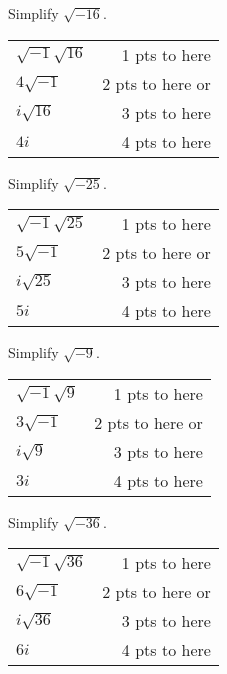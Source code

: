 {
	Simplify $\sqrt{-16}$.
}
{
	\begin{tabular}{l r}
	$\sqrt{-1}\sqrt{16}$ & 1 pts to here\\
	$4\sqrt{-1}$ & 2 pts to here or\\
	$i\sqrt{16}$ & 3 pts to here\\
	$4i$ & 4 pts to here
	\end{tabular}
}

{
	Simplify $\sqrt{-25}$.
}
{
	\begin{tabular}{l r}
	$\sqrt{-1}\sqrt{25}$ & 1 pts to here\\
	$5\sqrt{-1}$ & 2 pts to here or\\
	$i\sqrt{25}$ & 3 pts to here\\
	$5i$ & 4 pts to here
	\end{tabular}
}

{
	Simplify $\sqrt{-9}$.
}
{
	\begin{tabular}{l r}
	$\sqrt{-1}\sqrt{9}$ & 1 pts to here\\
	$3\sqrt{-1}$ & 2 pts to here or\\
	$i\sqrt{9}$ & 3 pts to here\\
	$3i$ & 4 pts to here
	\end{tabular}
}

{
	Simplify $\sqrt{-36}$.
}
{
	\begin{tabular}{l r}
	$\sqrt{-1}\sqrt{36}$ & 1 pts to here\\
	$6\sqrt{-1}$ & 2 pts to here or\\
	$i\sqrt{36}$ & 3 pts to here\\
	$6i$ & 4 pts to here
	\end{tabular}
}
